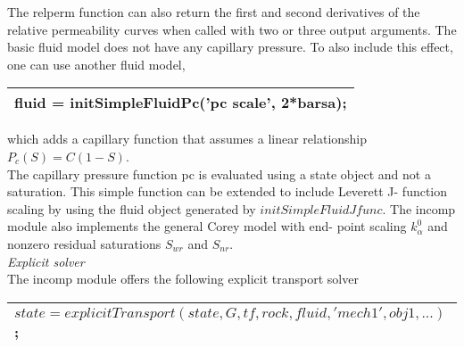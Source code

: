 \documentclass[a4paper,10pt]{report}
\begin{document}
The relperm function can also return the first and second derivatives of the
relative permeability curves when called with two or three output arguments.
The basic fluid model does not have any capillary pressure. To also include
this effect, one can use another fluid model,
\begin{table}[!ht]
\centering
\begin{tabular}{ |l |} 
\hline
fluid = initSimpleFluidPc('pc scale', 2*barsa);\\
 \hline
\end{tabular}
\label{table:fluid}
\end{table} 
which adds a capillary function that assumes a linear relationship $P_c (S) =
C(1 − S)$. \\
The capillary pressure function pc is evaluated using a state object and not
a saturation. This simple function can be extended to include Leverett J-
function scaling by using the fluid object generated by
$initSimpleFluidJfunc$.
The incomp module also implements the general Corey model with end-
point scaling $k_{\alpha}^0$ and nonzero residual saturations $S_{wr}$ and $S_{nr}$.\\

\emph{Explicit solver}\\
The incomp module offers the following explicit transport solver
\begin{table}[!ht]
\centering
\begin{tabular}{ |l |} 
\hline
$state = explicitTransport(state, G, tf, rock, fluid, 'mech1', obj1, ...)$;\\
 \hline
\end{tabular}
\label{table:etransp}
\end{table} 
\end{document}
